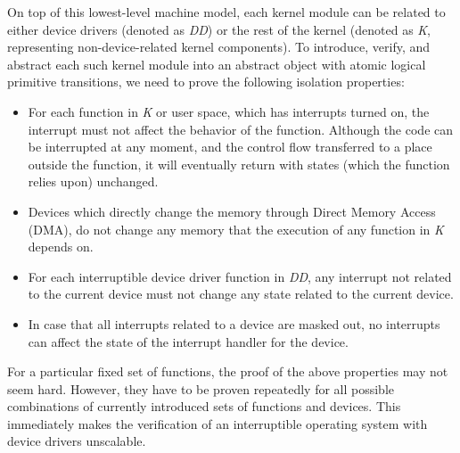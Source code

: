 
On top of this lowest-level machine model, each kernel module can be
related to either device drivers (denoted as {\it DD}) or the rest of
the kernel (denoted as {\it K}, representing non-device-related kernel
components).  To introduce, verify, and abstract each such kernel
module into an abstract object with atomic logical primitive
transitions, we need to prove the following isolation properties:
\begin{itemize}
\item For each function in {\it K} or user space, which has interrupts
  turned on, the interrupt must not affect the behavior of the
  function. Although the code can be interrupted at any moment, and
  the control flow transferred to a place outside the function, it
  will eventually return with states (which the function relies upon)
  unchanged.

\item Devices which directly change the memory through Direct Memory
  Access (DMA), do not change any memory that the execution of any
  function in {\it K} depends on.

\item For each interruptible device driver function in {\it DD}, any interrupt
not related to the current device must not change any state related to the
current device.

\item In case that all interrupts related to a device are masked out, no 
interrupts can affect 
the state of the interrupt handler for the device.
\end{itemize}

For a particular fixed set of functions, the proof of the above
properties may not seem hard. However, they have to be proven
repeatedly for all possible combinations of currently introduced sets
of functions and devices. This immediately makes the verification of
an interruptible operating system with device drivers
unscalable. 

